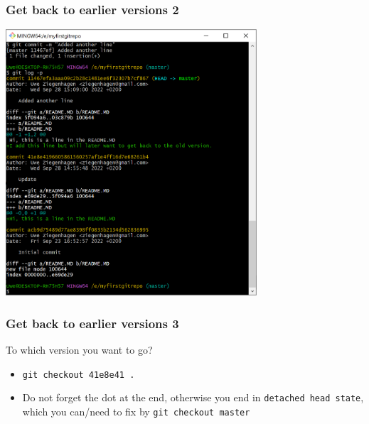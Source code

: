 \documentclass[12pt,english]{beamer}
\begin{document}
\begin{frame}
\frametitle{Get back to earlier  versions 2}

\begin{center}
\includegraphics[width=0.7\textwidth]{getback-3}
\end{center}

\end{frame}

\begin{frame}
\frametitle{Get back to earlier versions 3}

To which version you want to go? 

\begin{center}
\end{center}

\begin{itemize}
\item \texttt{git checkout 41e8e41 .}
\item Do not forget the dot at the end, otherwise you end in \texttt{detached head state}, which you can/need to fix by \texttt{git checkout master}
\end{itemize}

\end{frame}
\end{document}
